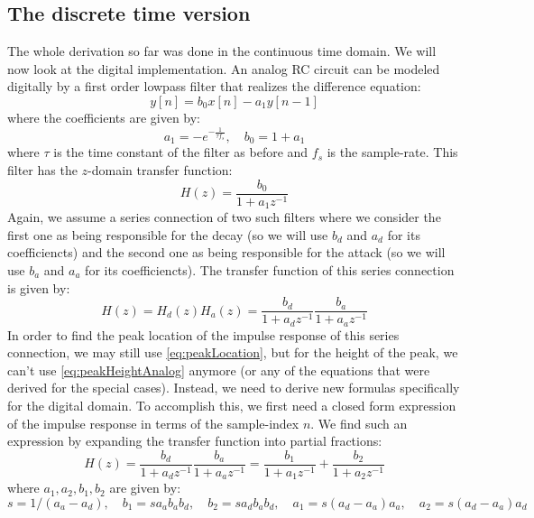 \subsection{The discrete time version}
The whole derivation so far was done in the continuous time domain. We will now look at the digital implementation. An analog RC circuit can be modeled digitally by a first order lowpass filter that realizes the difference equation:
\begin{equation}
 y[n] = b_0 x[n] - a_1 y[n-1]
\end{equation}
where the coefficients are given by:
\begin{equation}
 a_1 =  -e^{-\frac{1}{\tau f_s}}, \quad b_0 = 1+a_1
\end{equation}
where $\tau$ is the time constant of the filter as before and $f_s$ is the sample-rate. This filter has the $z$-domain transfer function:
\begin{equation}
 H(z) =  \frac{b_0}{1+a_1 z^{-1}}
\end{equation}
Again, we assume a series connection of two such filters where we consider the first one as being responsible for the decay (so we will use $b_d$ and $a_d$ for its coefficiencts) and the second one as being responsible for the attack (so we will use $b_a$ and $a_a$ for its coefficiencts). The transfer function of this series connection is given by:
\begin{equation}
 H(z) = H_d(z) H_a(z) = \frac{b_d}{1+a_d z^{-1}} \frac{b_a}{1+a_a z^{-1}} 
\end{equation}
In order to find the peak location of the impulse response of this series connection, we may still use \ref{eq:peakLocation}, but for the height of the peak, we can't use \ref{eq:peakHeightAnalog} anymore (or any of the equations that were derived for the special cases). Instead, we need to derive new formulas specifically for the digital domain. To accomplish this, we first need a closed form expression of the impulse response in terms of the sample-index $n$. We find such an expression by expanding the transfer function into partial fractions:
\begin{equation}
 H(z) = \frac{b_d}{1+a_d z^{-1}} \frac{b_a}{1+a_a z^{-1}} 
 = \frac{b_1}{1+a_1 z^{-1}} + \frac{b_2}{1+a_2 z^{-1}} 
\end{equation}
where $a_1, a_2, b_1, b_2$ are given by:
\begin{equation}
 s = 1 / (a_a-a_d), \quad  b_1 = s a_a b_a b_d, \quad b_2 = s a_d b_a b_d, \quad a_1 = s(a_d-a_a)a_a, \quad a_2 = s(a_d-a_a)a_d
\end{equation}
